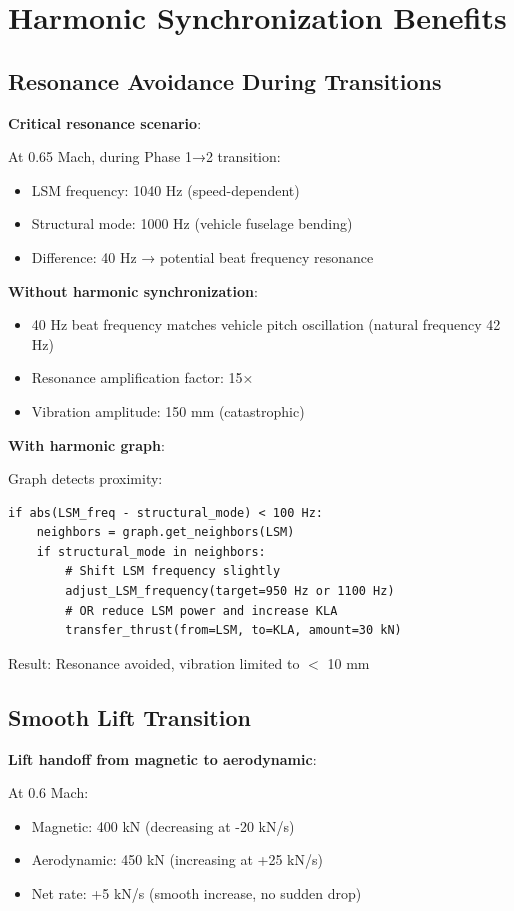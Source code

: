 \documentclass[12pt,a4paper]{article}
\begin{document}
\section{Harmonic Synchronization Benefits}

\subsection{Resonance Avoidance During Transitions}

\textbf{Critical resonance scenario}:

At 0.65 Mach, during Phase 1→2 transition:
\begin{itemize}
\item LSM frequency: 1040 Hz (speed-dependent)
\item Structural mode: 1000 Hz (vehicle fuselage bending)
\item Difference: 40 Hz → potential beat frequency resonance
\end{itemize}

\textbf{Without harmonic synchronization}:
\begin{itemize}
\item 40 Hz beat frequency matches vehicle pitch oscillation (natural frequency 42 Hz)
\item Resonance amplification factor: 15×
\item Vibration amplitude: 150 mm (catastrophic)
\end{itemize}

\textbf{With harmonic graph}:

Graph detects proximity:
\begin{verbatim}
if abs(LSM_freq - structural_mode) < 100 Hz:
    neighbors = graph.get_neighbors(LSM)
    if structural_mode in neighbors:
        # Shift LSM frequency slightly
        adjust_LSM_frequency(target=950 Hz or 1100 Hz)
        # OR reduce LSM power and increase KLA
        transfer_thrust(from=LSM, to=KLA, amount=30 kN)
\end{verbatim}

Result: Resonance avoided, vibration limited to $<$ 10 mm

\subsection{Smooth Lift Transition}

\textbf{Lift handoff from magnetic to aerodynamic}:

At 0.6 Mach:
\begin{itemize}
\item Magnetic: 400 kN (decreasing at -20 kN/s)
\item Aerodynamic: 450 kN (increasing at +25 kN/s)
\item Net rate: +5 kN/s (smooth increase, no sudden drop)
\end{itemize}
\end{document}
